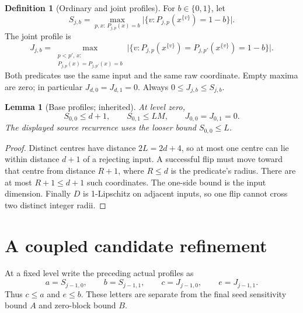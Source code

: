 \documentclass[11pt]{amsart}
\newtheorem{lemma}[theorem]{Lemma}
\theoremstyle{definition}
\newtheorem{definition}[theorem]{Definition}
\theoremstyle{remark}
\begin{document}
\begin{definition}[Ordinary and joint profiles]\label{def:profiles}
For $b\in\{0,1\}$, let
\[
 S_{j,b}=\max_{p,x:\,P_{j,p}(x)=b}
 \bigl|\{v:P_{j,p}(x^{\{v\}})=1-b\}\bigr|.
\]
The joint profile is
\[
 J_{j,b}=\max_{\substack{p<p',\,x:\\P_{j,p}(x)=P_{j,p'}(x)=b}}
 \bigl|\{v:P_{j,p}(x^{\{v\}})=P_{j,p'}(x^{\{v\}})=1-b\}\bigr|.
\]
Both predicates use the same input and the same raw coordinate. Empty
maxima are zero; in particular $J_{d,0}=J_{d,1}=0$. Always
$0\le J_{j,b}\le S_{j,b}$.
\end{definition}

\begin{lemma}[Base profiles; inherited]\label{lem:baseprofiles}
At level zero,
\[
 S_{0,0}\le d+1,\qquad S_{0,1}\le LM,\qquad J_{0,0}=J_{0,1}=0.
\]
The displayed source recurrence uses the looser bound $S_{0,0}\le L$.
\end{lemma}
\begin{proof}
Distinct centres have distance $2L=2d+4$, so at most one centre can
lie within distance $d+1$ of a rejecting input. A successful flip must
move toward that centre from distance $R+1$, where $R\le d$ is the
predicate's radius. There are at most $R+1\le d+1$ such coordinates.
The one-side bound is the input dimension. Finally $D$ is 1-Lipschitz
on adjacent inputs, so one flip cannot cross two distinct integer radii.
\end{proof}

\section{A coupled candidate refinement}
At a fixed level write the preceding actual profiles as
\begin{equation}\label{eq:childnames}
 a=S_{j-1,0},\qquad b=S_{j-1,1},\qquad
 c=J_{j-1,0},\qquad e=J_{j-1,1}.
\end{equation}
Thus $c\le a$ and $e\le b$. These letters are separate from the final
seed sensitivity bound $A$ and zero-block bound $B$.
\end{document}
